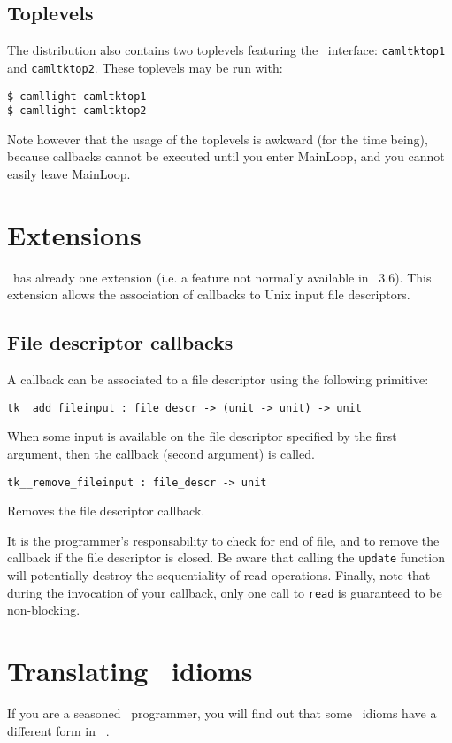 \subsection{Toplevels}
The distribution also contains two toplevels featuring the \camltk\
interface: \verb|camltktop1| and \verb|camltktop2|.
These toplevels may be run with: 
\begin{verbatim}
$ camllight camltktop1
$ camllight camltktop2
\end{verbatim} 
Note however that the usage of the toplevels is awkward (for the time
being), because callbacks cannot be executed until you enter MainLoop, and
you cannot easily leave MainLoop.

\section{Extensions}
\camltk\ has already one extension (i.e. a feature not normally available in
\tk\ 3.6). This extension allows the association of callbacks to Unix input
file descriptors.

\subsection{File descriptor callbacks}
A callback can be associated to a file descriptor using the following
primitive:
\begin{verbatim}
tk__add_fileinput : file_descr -> (unit -> unit) -> unit
\end{verbatim} 
When some input is available on the file descriptor specified by the first
argument, then the callback (second argument) is called.
\begin{verbatim}
tk__remove_fileinput : file_descr -> unit
\end{verbatim} 
Removes the file descriptor callback. 

It is the programmer's responsability
to check for end of file, and to remove the callback if the file descriptor
is closed. Be aware that calling the \verb|update| function will potentially
destroy the sequentiality of read operations. Finally, note that during the
invocation of your callback, only one call to \verb|read| is guaranteed to
be non-blocking.

\section{Translating \tk\ idioms}
If you are a seasoned \tk\ programmer, you will find out that some \tk\
idioms have a different form in \camltk\ .

